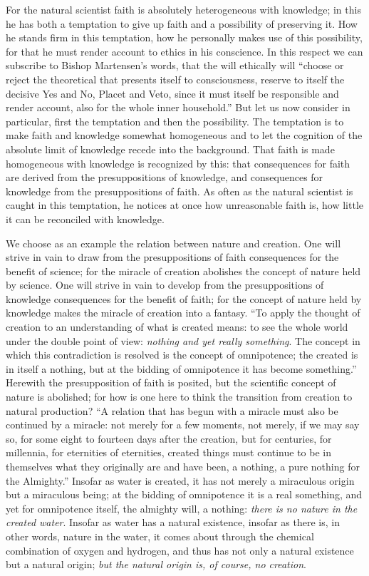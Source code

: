 \documentclass[12pt]{book}
\newcommand{\opage}[1]{\marginnote{\footnotesize\textit{[#1]}}}
\begin{document}
For the natural scientist faith is absolutely heterogeneous with knowledge; in this he has both a temptation to give up faith and a possibility of preserving it. How he stands firm in this temptation, how he personally makes use of this possibility, for that he must render account to ethics in his conscience. In this respect we can subscribe to Bishop Martensen's words, that the will ethically will ``choose or reject the theoretical that presents itself to consciousness, reserve to itself the decisive Yes and No, Placet and Veto, since it must itself be responsible and render account, also for the whole inner household.'' But let us now consider in particular, first the temptation and then the possibility. The temptation is to make faith and knowledge somewhat homogeneous and to let the cognition
\opage{30}\setcounter{footnote}{0}%
of the absolute limit of knowledge recede into the background. That faith is made homogeneous with knowledge is recognized by this: that consequences for faith are derived from the presuppositions of knowledge, and consequences for knowledge from the presuppositions of faith. As often as the natural scientist is caught in this temptation, he notices at once how unreasonable faith is, how little it can be reconciled with knowledge.

We choose as an example the relation between nature and creation. One will strive in vain to draw from the presuppositions of faith consequences for the benefit of science; for the miracle of creation abolishes the concept of nature held by science. One will strive in vain to develop from the presuppositions of knowledge consequences for the benefit of faith; for the concept of nature held by knowledge makes the miracle of creation into a fantasy. ``To apply the thought of creation to an understanding of what is created means: to see the whole world under the double point of view: \emph{nothing and yet really something}. The concept in which this contradiction is resolved is the concept of omnipotence; the created is in itself a nothing, but at the bidding of omnipotence it has become something.'' Herewith the presupposition of faith is posited, but the scientific concept of nature is abolished; for how is one here to think the transition from creation to natural production? ``A relation that has begun with a miracle must also be continued by a miracle: not merely for a few moments, not merely, if we may say so, for some eight to fourteen days after the creation, but for centuries, for millennia, for eternities of eternities, created things must continue to be in themselves what they originally are and have been, a nothing, a pure nothing for the Almighty.'' Insofar as water is created, it has not merely a miraculous origin but a miraculous being; at the bidding of omnipotence it is a real something, and yet for omnipotence itself, the almighty will, a nothing: \emph{there is no nature in the created water}. Insofar as water has a natural existence, insofar as there is,
\opage{31}\setcounter{footnote}{0}%
in other words, nature in the water, it comes about through the chemical combination of oxygen and hydrogen, and thus has not only a natural existence but a natural origin; \emph{but the natural origin is, of course, no creation}.
\end{document}
